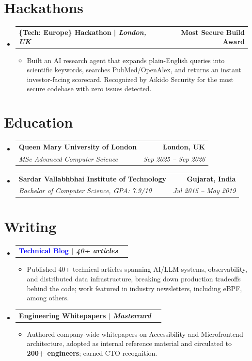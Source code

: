 \documentclass[letterpaper,11pt]{article}
\makeatletter
\newcommand{\resumeItem}[1]{
  \item\small{
    {#1 \vspace{-3pt}}
  }
}
\newcommand{\resumeSubheading}[4]{
  \vspace{-3pt}\item
    \begin{tabular*}{1.0\textwidth}[t]{l@{\extracolsep{\fill}}r}
      \textbf{#1} & \textbf{\small #2} \\
      \textit{\small#3} & \textit{\small #4} \\
    \end{tabular*}\vspace{-2pt}
}
\newcommand{\resumeProjectHeading}[2]{
  \vspace{-3pt}\item
    \begin{tabular*}{1.0\textwidth}[t]{l@{\extracolsep{\fill}}r}
      \textbf{#1} & \textbf{\small #2} \\
    \end{tabular*}\vspace{-7pt}
}
\newcommand{\projectLink}[2]{\href{#1}{\textcolor{blue}{\underline{#2}}}}
\newcommand{\resumeSubHeadingListStart}{\begin{itemize}[leftmargin=0.0in, label={}]}
\newcommand{\resumeSubHeadingListEnd}{\end{itemize}}
\newcommand{\resumeItemListStart}{\begin{itemize}}
\newcommand{\resumeItemListEnd}{\end{itemize}\vspace{0pt}}
\makeatother
\begin{document}
\section{Hackathons}
\resumeSubHeadingListStart
    \resumeProjectHeading
      {\{Tech: Europe\} Hackathon \emph{$|$ London, UK}}{Most Secure Build Award}
      \resumeItemListStart
        \resumeItem{Built an AI research agent that expands plain-English queries into scientific keywords, searches PubMed/OpenAlex, and returns an instant investor-facing scorecard. Recognized by Aikido Security for the most secure codebase with zero issues detected.}
      \resumeItemListEnd
\resumeSubHeadingListEnd

\section{Education}
  \resumeSubHeadingListStart
    \resumeSubheading
      {Queen Mary University of London}{London, UK}
      {MSc Advanced Computer Science}{Sep 2025 -- Sep 2026}
    \resumeSubheading
      {Sardar Vallabhbhai Institute of Technology}{Gujarat, India}
      {Bachelor of Computer Science, GPA: 7.9/10}{Jul 2015 -- May 2019}
  \resumeSubHeadingListEnd

\section{Writing}
\resumeSubHeadingListStart
    \resumeProjectHeading
      {\projectLink{https://patelofthought.com/blog}{Technical Blog} \emph{$|$ 40+ articles}}{}
      \resumeItemListStart
        \resumeItem{Published 40+ technical articles spanning AI/LLM systems, observability, and distributed data infrastructure, breaking down production tradeoffs behind the code; work featured in industry newsletters, including eBPF, among others.}
      \resumeItemListEnd
    \resumeProjectHeading
      {Engineering Whitepapers \emph{$|$ Mastercard}}{}
      \resumeItemListStart
        \resumeItem{Authored company-wide whitepapers on Accessibility and Microfrontend architecture, adopted as internal reference material and circulated to \textbf{200+ engineers}; earned CTO recognition.}
      \resumeItemListEnd
\resumeSubHeadingListEnd
\end{document}
